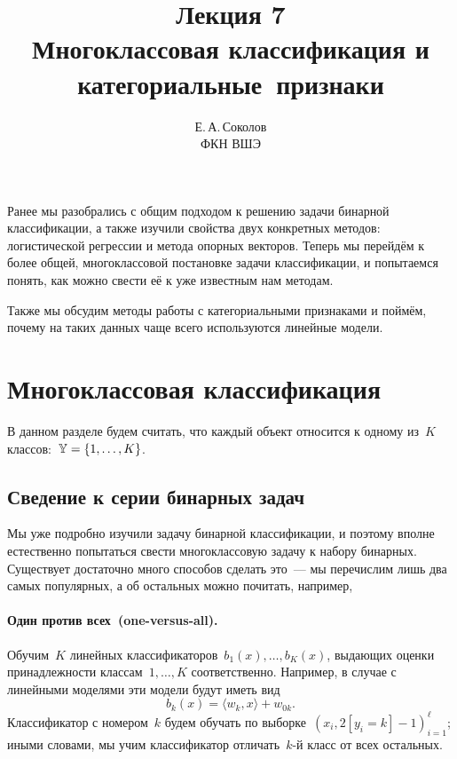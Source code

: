 \documentclass[12pt,fleqn]{article}
\begin{document}
\title{Лекция 7\\Многоклассовая классификация и категориальные~признаки}
\author{Е.\,А.\,Соколов\\ФКН ВШЭ}
\maketitle

Ранее мы разобрались с общим подходом к решению задачи бинарной классификации,
а также изучили свойства двух конкретных методов: логистической регрессии и метода опорных векторов.
Теперь мы перейдём к более общей, многоклассовой постановке задачи классификации,
и попытаемся понять, как можно свести её к уже известным нам методам.

Также мы обсудим методы работы с категориальными признаками
и поймём, почему на таких данных чаще всего используются линейные модели.

\section{Многоклассовая классификация}

В данном разделе будем считать, что каждый объект относится к одному из~$K$ классов:~$\mathbb{Y} = \{1, \dots, K\}$.

\subsection{Сведение к серии бинарных задач}

Мы уже подробно изучили задачу бинарной классификации, и поэтому вполне естественно
попытаться свести многоклассовую задачу к набору бинарных.
Существует достаточно много способов сделать это~--- мы перечислим лишь
два самых популярных, а об остальных можно почитать, например, \cite[раздел 4.2.7]{merkov14ml}

\paragraph{Один против всех~(one-versus-all).}
Обучим~$K$ линейных классификаторов~$b_1(x), \dots, b_K(x)$,
выдающих оценки принадлежности классам~$1, \dots, K$ соответственно.
Например, в случае с линейными моделями эти модели будут иметь вид
\[
    b_k(x) = \langle w_k, x \rangle + w_{0k}.
\]
Классификатор с номером~$k$ будем обучать по
выборке~$\left(x_i, 2 [y_i = k] - 1\right)_{i = 1}^{\ell}$;
иными словами, мы учим классификатор отличать~$k$-й класс от всех остальных.
\end{document}
